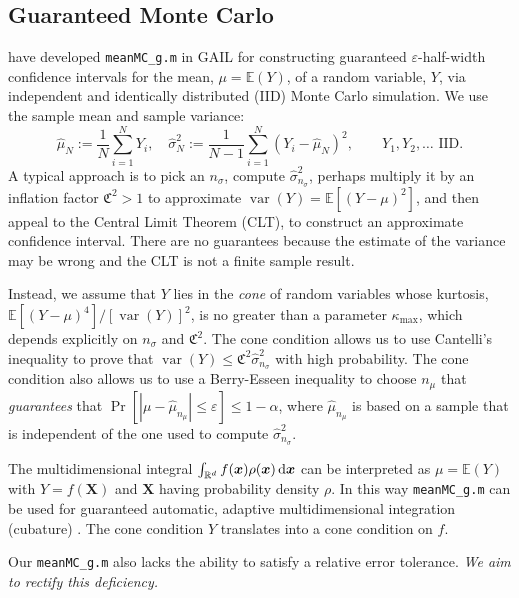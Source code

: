 \documentclass[11pt]{NSFamsart}
\def\reals{{\mathbb{R}}}
\newcommand{\bbE}{\mathbb{E}}
\DeclareMathOperator*{\var}{var}
\newcommand{\bx}{{\boldsymbol{x}}}
\newcommand{\bX}{{\boldsymbol{X}}}
\def\dif{\textup{d}}
\newcommand{\fC}{\mathfrak{C}}
\def\abs#1{\ensuremath{\left \lvert #1 \right \rvert}}
\newcommand{\hmu}{\hat{\mu}}
\newcommand{\hsigma}{\hat{\sigma}}
\begin{document}
\begin{description}[leftmargin=2.5ex]
\subsection{Guaranteed Monte Carlo} \label{MC_g_sec}
\cite{HicEtal14a} have developed {\tt meanMC\_g.m} in GAIL for constructing guaranteed $\varepsilon$-half-width confidence intervals for the mean, $\mu=\bbE(Y)$, of a random variable, $Y$, via independent and identically distributed (IID) Monte Carlo simulation.  We use the sample mean and sample variance:
\begin{equation} \label{samplemean}
\hmu_{N}:=\frac 1{N} \sum_{i=1}^{N} Y_i, \quad \hsigma_{N}^2:=\frac 1{N-1} \sum_{i=1}^N (Y_i-\hmu_{N})^2, \qquad Y_1, Y_2, \ldots \text{ IID}.
\end{equation}
A typical approach is to pick an $n_{\sigma}$, compute $\hsigma_{n_{\sigma}}^2$, perhaps multiply it by an inflation factor $\fC^2>1$ to approximate $\var(Y)=\bbE[(Y-\mu)^2]$, and then appeal to the  Central Limit Theorem (CLT), to construct an approximate confidence interval.  There are no guarantees because the estimate of the variance may be wrong and the CLT is not a finite sample result.

Instead, we assume that $Y$ lies in the \emph{cone} of random variables whose kurtosis, $\bbE[(Y-\mu)^4]/[\var(Y)]^2$, is no greater than a parameter $\kappa_{\max}$, which depends explicitly on $n_{\sigma}$ and $\fC^2$.  The cone condition allows us to use Cantelli's inequality to prove that $\var(Y)\le \fC^2\hsigma_{n_\sigma}^2$ with high probability.  The cone condition also allows us to use a Berry-Esseen inequality to choose $n_{\mu}$ that \emph{guarantees} that $\Pr[\abs{\mu-\hmu_{n_{\mu}}} \le \varepsilon]\le 1-\alpha$, where $\hmu_{n_{\mu}}$ is based on a sample that is independent of the one used to compute $\hsigma_{n_\sigma}^2$.

The multidimensional integral $\int_{\reals^d} f(\bx) \rho(\bx) \, \dif \bx$ can be interpreted as $\mu=\bbE(Y)$ with $Y=f(\bX)$ and $\bX$ having probability density $\rho$. In this way {\tt meanMC\_g.m} can be used for guaranteed automatic, adaptive multidimensional integration (cubature) \citep{HicEtal14a}.  The cone condition $Y$ translates into a cone condition on $f$.

Our {\tt meanMC\_g.m} also lacks the ability to satisfy a relative error tolerance. \emph{We aim to rectify this deficiency.}


\end{description}
\end{document}
